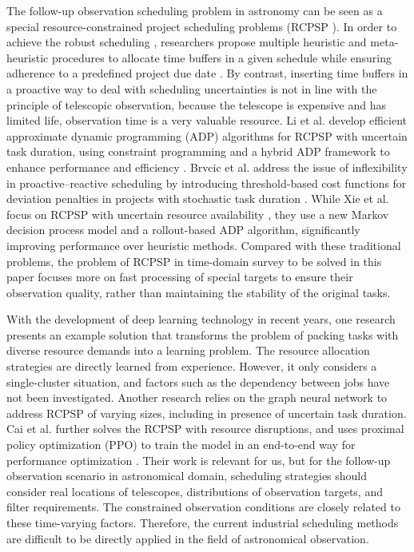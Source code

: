 The follow-up observation scheduling problem in astronomy can be seen as a special resource-constrained project scheduling problems (RCPSP \cite{demeulemeester2002project}). In order to achieve the robust scheduling \cite{lambrechts2008tabu,lambrechts2011time}, researchers propose multiple heuristic and meta-heuristic procedures to allocate time buffers in a given schedule while ensuring adherence to a predefined project due date \cite{van2008proactive}. By contrast, inserting time buffers in a proactive way to deal with scheduling uncertainties is not in line with the principle of telescopic observation, because the telescope is expensive and has limited life, observation time is a very valuable resource. Li et al. develop efficient approximate dynamic programming (ADP) algorithms for RCPSP with uncertain task duration, using constraint programming and a hybrid ADP framework to enhance performance and efficiency \cite{li2015solving}. Brvcic et al. address the issue of inflexibility in proactive–reactive scheduling by introducing threshold-based cost functions for deviation penalties in projects with stochastic task duration \cite{brvcic2019planning}. While Xie et al. focus on RCPSP with uncertain resource availability \cite{xie2021approximate}, they use a new Markov decision process model and a rollout-based ADP algorithm, significantly improving performance over heuristic methods. Compared with these traditional problems, the problem of RCPSP in time-domain survey to be solved in this paper focuses more on fast processing of special targets to ensure their observation quality, rather than maintaining the stability of the original tasks. 


With the development of deep learning technology in recent years, one research \cite{mao2016resource} presents an example solution that transforms the problem of packing tasks with diverse resource demands into a learning problem. The resource allocation strategies are directly learned from experience. However, it only considers a single-cluster situation, and factors such as the dependency between jobs have not been investigated. Another research \cite{teichteil2023fast} relies on the graph neural network to address RCPSP of varying sizes, including in presence of uncertain task duration. Cai et al. further solves the RCPSP with resource disruptions, and uses proximal policy optimization (PPO) to train the model in an end-to-end way for performance optimization \cite{cai2024deep}. Their work is relevant for us, but for the follow-up observation scenario in astronomical domain, scheduling strategies should consider real locations of telescopes, distributions of observation targets, and filter requirements. The constrained observation conditions are closely related to these time-varying factors. Therefore, the current industrial scheduling methods are difficult to be directly applied in the field of astronomical observation.

